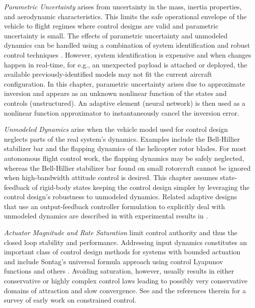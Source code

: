 \emph{Parametric Uncertainty} arises from uncertainty in the mass, inertia properties, and aerodynamic characteristics. This limits the safe operational envelope of the vehicle to flight regimes where control designs are valid and parametric uncertainty is small. The effects of parametric uncertainty and unmodeled dynamics can be handled using a combination of system identification \cite{gavrilets:gnc:01,civita:ahs:02,mettler} and robust control techniques \cite{civita:gnc:02,gavrilets:gnc:02,civita:acc:03}.  However, system identification is expensive and when changes happen in real-time, for e.g., an unexpected payload is attached or deployed, the available previously-identified models may not fit the current aircraft configuration.  In this chapter, parametric uncertainty arises due to approximate inversion and appears as an unknown nonlinear function of the states and controls (unstructured). An adaptive element (neural network) is then used as a nonlinear function approximator to instantaneously cancel the inversion error.

\emph{Unmodeled Dynamics} arise when the vehicle model used for control design neglects parts of the real system's dynamics. Examples include the Bell-Hillier stabilizer bar and the flapping dynamics of the helicopter rotor blades. For most autonomous flight control work, the flapping dynamics may be safely neglected, whereas the Bell-Hillier stabilizer bar found on small rotorcraft cannot be ignored when high-bandwidth attitude control is desired. This chapter assumes state-feedback of rigid-body states keeping the control design simpler by leveraging the control design's robustness to unmodeled dynamics. Related adaptive designs that use an output-feedback controller formulation to explicitly deal with unmodeled dynamics are described in \cite{calise:automatica:2001} with experimental results in \cite{corban:gnc:2003}.

\emph{Actuator Magnitude and Rate Saturation} limit control authority and thus the closed loop stability and performance. Addressing input dynamics constitutes an important class of control design methods for systems with bounded actuation and include Sontag's universal formula approach using control Lyapunov functions \cite{lin:scl:91} and others \cite{bemporad:itac:97,pappas:cdc:95}. Avoiding saturation, however, usually results in either conservative or highly complex control laws leading to possibly very conservative domains of attraction and slow convergence. See \cite{bernstein:ijrnc:95} and the references therein for a survey of early work on constrained control. 


